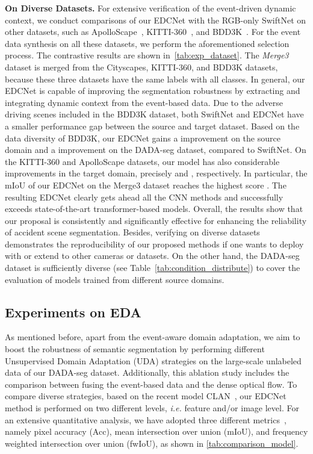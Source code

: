 \documentclass[journal]{IEEEtran}
\begin{document}
\textbf{On Diverse Datasets.}
For extensive verification of the event-driven dynamic context, we conduct comparisons of our EDCNet with the RGB-only SwiftNet on other datasets, such as ApolloScape~\cite{wang2019apolloscape}, KITTI-360~\cite{xie2016semantic}, and BDD3K~\cite{yu2020bdd100k}. For the event data synthesis on all these datasets, we perform the aforementioned selection process. The contrastive results are shown in~\cref{tab:exp_dataset}. The \textit{Merge3} dataset is merged from the Cityscapes, KITTI-360, and BDD3K datasets, because these three datasets have the same labels with all  classes. In general, our EDCNet is capable of improving the segmentation robustness by extracting and integrating dynamic context from the event-based data. Due to the adverse driving scenes included in the BDD3K dataset, both SwiftNet and EDCNet have a smaller performance gap between the source and target dataset. {Based on the data diversity of BDD3K}, our EDCNet gains a  improvement on the source domain and a  improvement on the DADA-seg dataset, compared to SwiftNet. On the KITTI-360 and ApolloScape datasets, our model has also considerable improvements in the target domain, precisely  and , respectively. In particular, the mIoU of our EDCNet on the Merge3 dataset reaches the highest score . {The resulting EDCNet clearly gets ahead all the CNN methods and  successfully exceeds state-of-the-art transformer-based models.} Overall, the results show that our proposal is consistently and significantly effective for enhancing the reliability of accident scene segmentation. Besides, verifying on diverse datasets demonstrates the reproducibility of our proposed methods if one wants to deploy with or extend to other cameras or datasets. On the other hand, the DADA-seg dataset is sufficiently diverse (see Table~\ref{tab:condition_distribute}) to cover the evaluation of models trained from different source domains.

\subsection{Experiments on EDA}\label{Subsection4_2}
As mentioned before, apart from the event-aware domain adaptation, we aim to boost the robustness of semantic segmentation by performing different Unsupervised Domain Adaptation (UDA) strategies on the large-scale unlabeled data of our DADA-seg dataset. Additionally, this ablation study includes the comparison between fusing the event-based data and the dense optical flow. To compare diverse strategies, based on the recent model CLAN~\cite{luo2019CLAN}, our EDCNet method is performed on two different levels, \textit{i.e.} feature and/or image level. For an extensive quantitative analysis, we have adopted three different metrics~\cite{long2015FCN}, namely pixel accuracy (Acc), mean intersection over union (mIoU), and frequency weighted intersection over union (fwIoU), as shown in \cref{tab:comparison_model}. 
\end{document}
